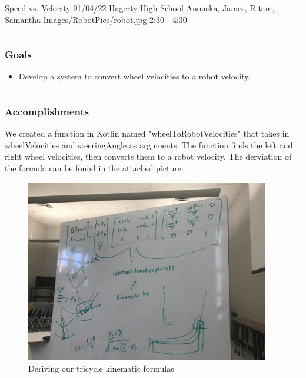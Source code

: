 \insertmeeting 
	{Speed vs. Velocity} 
	{01/04/22} 
	{Hagerty High School}
	{Anouska, James, Ritam, Samantha}
	{Images/RobotPics/robot.jpg}
	{2:30 - 4:30}
	
\noindent\hfil\rule{\textwidth}{.4pt}\hfil
\subsubsection*{Goals}
\begin{itemize}
    \item Develop a system to convert wheel velocities to a robot velocity.

\end{itemize} 

\noindent\hfil\rule{\textwidth}{.4pt}\hfil

\subsubsection*{Accomplishments}
We created a function in Kotlin named "wheelToRobotVelocities" that takes in wheelVelocities and steeringAngle as arguments. The function finds the left and right wheel velocities, then converts them to a robot velocity. The derviation of the formula can be found in the attached picture. 


\begin{figure}[htp]
\centering
\includegraphics[width=0.95\textwidth, angle=0]{Meetings/January/01-04-22/SteeringAngletoHeadingFormula - Big Boik.JPG}
\caption{Deriving our tricycle kinematic formulas}
\label{fig:010422_1}
\end{figure}

